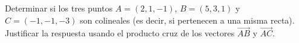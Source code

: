 Determinar si los tres puntos $A = (2, 1, -1)$, $B = (5, 3, 1)$ y $C = (-1, -1, -3)$ son colineales (es decir, si pertenecen a una misma recta). Justificar la respuesta usando el producto cruz de los vectores $\overrightarrow{AB}$ y $\overrightarrow{AC}$.